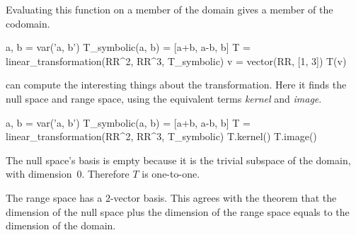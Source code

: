 Evaluating this function on a member of the domain gives a member
of the codomain. 
\begin{sageoutput}[d,0,3]
a, b = var('a, b')   
T_symbolic(a, b) = [a+b, a-b, b]         
T = linear_transformation(RR^2, RR^3, T_symbolic)
v = vector(RR, [1, 3])  
T(v)
\end{sageoutput}

\Sage{} can compute the interesting things about the transformation.
Here it finds the null space 
and range space, using the equivalent 
terms \textit{kernel} and \textit{image}.
\begin{sageoutput}[d,0,3;s,4,70,58;s,8,70,58]
a, b = var('a, b')   
T_symbolic(a, b) = [a+b, a-b, b]         
T = linear_transformation(RR^2, RR^3, T_symbolic)
T.kernel()                                       
T.image()                                        
\end{sageoutput}
The null space's basis is empty because 
it is the trivial subspace of the domain,
with dimension~$0$.
Therefore $T$ is one-to-one.

The range space has a $2$-vector basis. 
This agrees with the theorem that
the dimension of the null space plus the dimension of the 
range space equals to the dimension of the domain.


